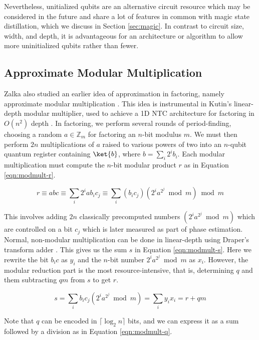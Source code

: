 Nevertheless, unitialized qubits are an alternative circuit resource which
may be considered in the future and share a lot of features in common with
magic state distillation, which we discuss in Section \ref{sec:magic}. In
contrast to circuit size, width, and depth, it is advantageous for
an architecture or algorithm
to allow more uninitialized qubits rather than fewer.

\subsection{Approximate Modular Multiplication}

Zalka also studied an earlier idea of approximation in factoring, namely
approximate modular multiplication \cite{Zalka1998}.
This idea is instrumental in Kutin's linear-depth modular multiplier,
used to achieve a 1D NTC architecture for factoring in $O(n^2)$ depth
\cite{Kutin2006}. In factoring, we perform several rounds of period-finding,
choosing a random $a \in \mathbb{Z}_m$ for factoring an $n$-bit modulus $m$.
We must then
perform $2n$ multiplications of $a$ raised to various powers of two
into an $n$-qubit quantum register containing $\ket{b}$, where
$b = \sum_{i} 2^ib_i$. Each
modular multiplication must compute the $n$-bit modular product
$r$ as in Equation \ref{eqn:modmult-r}.

\begin{equation}
r \equiv abc \equiv \sum_{i} 2^i a b_i c_j \equiv \sum_{i} (b_i c_j)(2^i a^{2^j} \bmod m) \bmod m
\label{eqn:modmult-r}
\end{equation}

This involves adding $2n$ classically precomputed numbers
$(2^i a^{2^j} \bmod m)$ which are controlled on a bit $c_j$
which is later measured as
part of phase estimation. Normal, non-modular multiplication can be done
in linear-depth using Draper's transform adder \cite{Draper2000}. This gives
us the sum $s$ in Equation \ref{eqn:modmult-s}. Here we rewrite the
bit $b_i c$ as $y_i$ and the $n$-bit number $2^i a^{2^j} \bmod m$ as
$x_i$. However,
the modular reduction part is the most resource-intensive, that is,
determining $q$ and them subtracting $qm$ from $s$ to get $r$.

\begin{equation}
s = \sum_i b_i c_j (2^i a^{2^j} \bmod m) = \sum_i y_i x_i = r + qm
\label{eqn:modmult-s}
\end{equation}

Note that $q$ can be encoded in $\lceil \log_2 n \rceil$ bits, and we can
express it as a sum followed by a division as in Equation \ref{eqn:modmult-q}.

